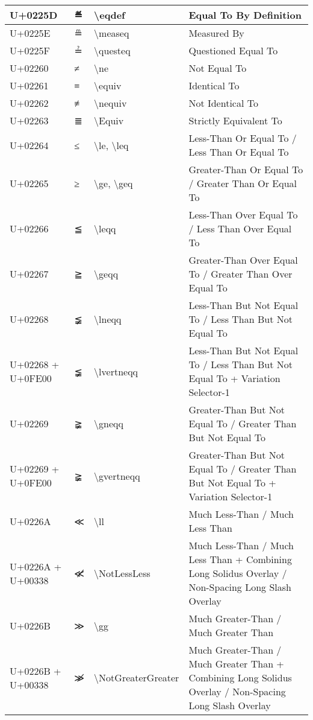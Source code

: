 \begin{table}[h]
\begin{tabulary}{\linewidth}{|L|L|L|L|}
\hline
U+0225D & ≝ & {\textbackslash}eqdef & Equal To By Definition \\
\hline
U+0225E & ≞ & {\textbackslash}measeq & Measured By \\
\hline
U+0225F & ≟ & {\textbackslash}questeq & Questioned Equal To \\
\hline
U+02260 & ≠ & {\textbackslash}ne & Not Equal To \\
\hline
U+02261 & ≡ & {\textbackslash}equiv & Identical To \\
\hline
U+02262 & ≢ & {\textbackslash}nequiv & Not Identical To \\
\hline
U+02263 & ≣ & {\textbackslash}Equiv & Strictly Equivalent To \\
\hline
U+02264 & ≤ & {\textbackslash}le, {\textbackslash}leq & Less-Than Or Equal To / Less Than Or Equal To \\
\hline
U+02265 & ≥ & {\textbackslash}ge, {\textbackslash}geq & Greater-Than Or Equal To / Greater Than Or Equal To \\
\hline
U+02266 & ≦ & {\textbackslash}leqq & Less-Than Over Equal To / Less Than Over Equal To \\
\hline
U+02267 & ≧ & {\textbackslash}geqq & Greater-Than Over Equal To / Greater Than Over Equal To \\
\hline
U+02268 & ≨ & {\textbackslash}lneqq & Less-Than But Not Equal To / Less Than But Not Equal To \\
\hline
U+02268 + U+0FE00 & ≨︀ & {\textbackslash}lvertneqq & Less-Than But Not Equal To / Less Than But Not Equal To + Variation Selector-1 \\
\hline
U+02269 & ≩ & {\textbackslash}gneqq & Greater-Than But Not Equal To / Greater Than But Not Equal To \\
\hline
U+02269 + U+0FE00 & ≩︀ & {\textbackslash}gvertneqq & Greater-Than But Not Equal To / Greater Than But Not Equal To + Variation Selector-1 \\
\hline
U+0226A & ≪ & {\textbackslash}ll & Much Less-Than / Much Less Than \\
\hline
U+0226A + U+00338 & ≪̸ & {\textbackslash}NotLessLess & Much Less-Than / Much Less Than + Combining Long Solidus Overlay / Non-Spacing Long Slash Overlay \\
\hline
U+0226B & ≫ & {\textbackslash}gg & Much Greater-Than / Much Greater Than \\
\hline
U+0226B + U+00338 & ≫̸ & {\textbackslash}NotGreaterGreater & Much Greater-Than / Much Greater Than + Combining Long Solidus Overlay / Non-Spacing Long Slash Overlay \\

\end{tabulary}
\end{table}
